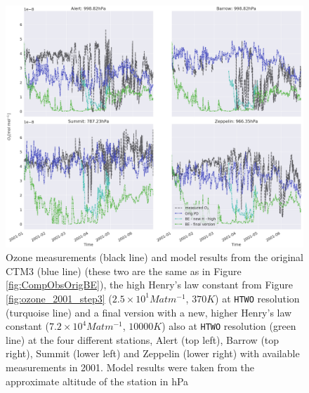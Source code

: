 \begin{figure}[ht]
    \centering
    \includegraphics[width=\linewidth]{Chapter6_Results/images/ozone_stationComp_2001/ozone_2001_step4.png}
    \caption{Ozone measurements (black line) and model results from the original CTM3 (blue line) (these two are the same as in Figure \ref{fig:CompObsOrigBE}), the high Henry's law constant from Figure \ref{fig:ozone_2001_step3} ($2.5\times10^{1} M atm ^{-1}$, $370 K$) at \texttt{HTWO} resolution (turquoise line) and a final version with a new, higher Henry's law constant ($7.2\times10^{4} M atm ^{-1}$, $10 000 K$) also at \texttt{HTWO} resolution (green line) at the four different stations, Alert (top left), Barrow (top right), Summit (lower left) and Zeppelin (lower right) with available measurements in 2001. Model results were taken from the approximate altitude of the station in hPa}
    \label{fig:ozone_2001_step4}
\end{figure}